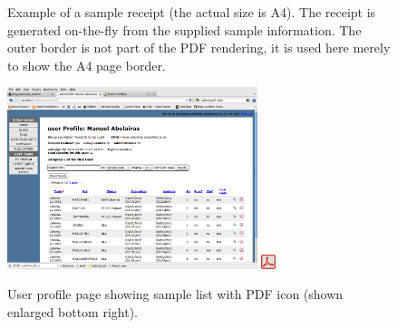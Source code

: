 \documentclass[12pt,twoside]{article}
\begin{document}
\begin{enumerate}[(i)]
\begin{figure}[!htb]
\begin{center}
\caption{Example of a sample receipt (the actual size is A4).
The receipt is generated on-the-fly from the supplied sample information. 
The outer border
is not part of the PDF rendering, it is used here merely to show
the A4 page border.\label{fig:samplereceipt}}
\end{center}
\end{figure}

\begin{figure}[!htb]
\begin{center}
\includegraphics[width=0.65\textwidth]{userprofile}
\quad
\includegraphics{pdf.png}
\caption{User profile page showing sample list with PDF icon (shown
enlarged bottom right).\label{fig:userprofile}}
\end{center}
\end{figure}


\end{enumerate}
\end{document}
